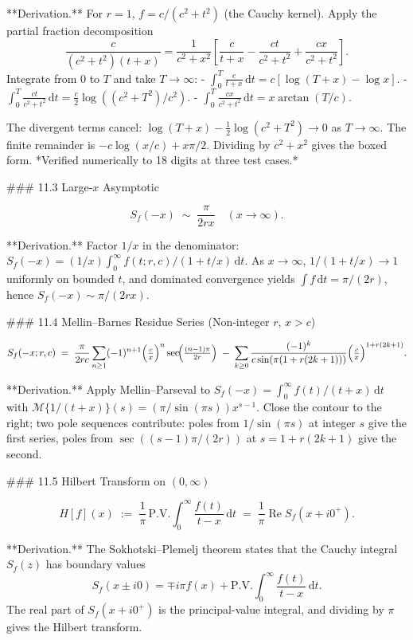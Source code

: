 **Derivation.** For $r=1$, $f = c/(c^{2}+t^{2})$ (the Cauchy kernel). Apply the partial fraction decomposition
$$
\frac{c}{(c^{2}+t^{2})(t+x)} = \frac{1}{c^{2}+x^{2}}\left[\frac{c}{t+x} - \frac{ct}{c^{2}+t^{2}} + \frac{cx}{c^{2}+t^{2}}\right].
$$
Integrate from 0 to $T$ and take $T\to\infty$:
- $\int_{0}^{T}\frac{c}{t+x}\,\mathrm dt = c[\log(T+x) - \log x]$.
- $\int_{0}^{T}\frac{ct}{c^{2}+t^{2}}\,\mathrm dt = \tfrac{c}{2}\log((c^{2}+T^{2})/c^{2})$.
- $\int_{0}^{T}\frac{cx}{c^{2}+t^{2}}\,\mathrm dt = x\arctan(T/c)$.

The divergent terms cancel: $\log(T+x) - \tfrac{1}{2}\log(c^{2}+T^{2}) \to 0$ as $T\to\infty$. The finite remainder is $-c\log(x/c) + x\pi/2$. Dividing by $c^{2}+x^{2}$ gives the boxed form. *Verified numerically to 18 digits at three test cases.*

### 11.3 Large‑$x$ Asymptotic

$$
S_{f}(-x) \;\sim\; \frac{\pi}{2rx}\quad(x\to\infty).
$$

**Derivation.** Factor $1/x$ in the denominator: $S_{f}(-x) = (1/x)\int_{0}^{\infty}f(t;r,c)/(1+t/x)\,\mathrm dt$. As $x\to\infty$, $1/(1+t/x)\to 1$ uniformly on bounded $t$, and dominated convergence yields $\int f\,\mathrm dt = \pi/(2r)$, hence $S_{f}(-x) \sim \pi/(2rx)$.

### 11.4 Mellin–Barnes Residue Series (Non‑integer $r$, $x>c$)

$$
S_{f}(-x;r,c) \;=\; \frac{\pi}{2rc}\sum_{n\ge 1}(-1)^{n+1}\Bigl(\tfrac{c}{x}\Bigr)^{n}\sec\!\Bigl(\tfrac{(n-1)\pi}{2r}\Bigr) \;-\; \sum_{k\ge 0}\frac{(-1)^{k}}{c\sin(\pi(1+r(2k+1)))}\Bigl(\tfrac{c}{x}\Bigr)^{1+r(2k+1)}.
$$

**Derivation.** Apply Mellin–Parseval to $S_{f}(-x) = \int_{0}^{\infty}f(t)/(t+x)\,\mathrm dt$ with $\mathcal M\{1/(t+x)\}(s) = (\pi/\sin(\pi s))x^{s-1}$. Close the contour to the right; two pole sequences contribute: poles from $1/\sin(\pi s)$ at integer $s$ give the first series, poles from $\sec((s-1)\pi/(2r))$ at $s = 1+r(2k+1)$ give the second.

### 11.5 Hilbert Transform on $(0,\infty)$

$$
H[f](x) \;:=\; \frac{1}{\pi}\,\text{P.V.}\!\int_{0}^{\infty}\frac{f(t)}{t-x}\,\mathrm dt \;=\; \frac{1}{\pi}\operatorname{Re} S_{f}(x+i0^{+}).
$$

**Derivation.** The Sokhotski–Plemelj theorem states that the Cauchy integral $S_{f}(z)$ has boundary values
$$
S_{f}(x\pm i0) = \mp i\pi f(x) + \text{P.V.}\int_{0}^{\infty}\frac{f(t)}{t-x}\,\mathrm dt.
$$
The real part of $S_{f}(x+i0^{+})$ is the principal-value integral, and dividing by $\pi$ gives the Hilbert transform.

